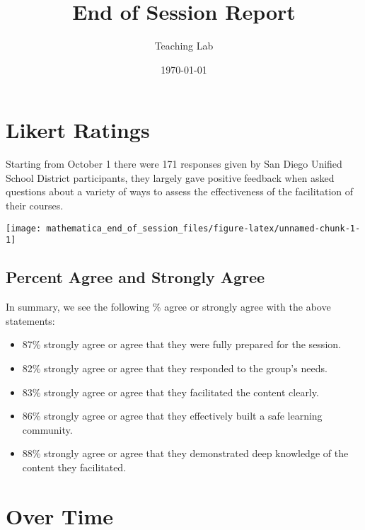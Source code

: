 \documentclass[10,a4paperpaper,]{article}
\title{End of Session Report}
\author{Teaching Lab}
\date{\today}
\begin{document}
\renewcommand{\contentsname}{Table of Contents}

\renewcommand{\pagename}{Page}


\maketitle
\tableofcontents
{}
\clearpage

\section{Likert Ratings}

Starting from October 1 there were 171 responses given by San Diego
Unified School District participants, they largely gave positive
feedback when asked questions about a variety of ways to assess the
effectiveness of the facilitation of their courses.

\begin{center}\texttt{[image: mathematica\_end\_of\_session\_files/figure-latex/unnamed-chunk-1-1]} \end{center}

\subsection{Percent Agree and Strongly Agree}

In summary, we see the following \% agree or strongly agree with the
above statements:

\begin{itemize}
\tightlist
\item
  87\% strongly agree or agree that they were fully prepared for the
  session.
\item
  82\% strongly agree or agree that they responded to the group's needs.
\item
  83\% strongly agree or agree that they facilitated the content
  clearly.
\item
  86\% strongly agree or agree that they effectively built a safe
  learning community.
\item
  88\% strongly agree or agree that they demonstrated deep knowledge of
  the content they facilitated.
\end{itemize}

\section{Over Time}
\end{document}
